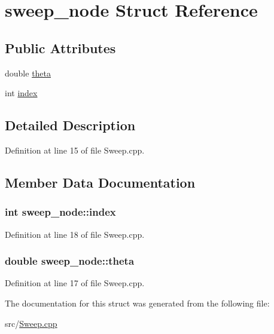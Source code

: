 \hypertarget{structsweep__node}{
\section{sweep\_\-node Struct Reference}
\label{structsweep__node}
}
\subsection*{Public Attributes}
\begin{DoxyCompactItemize}
\item 
double \hyperlink{structsweep__node_a6a5c4969b98240f34124e39ceaa2810d}{theta}
\item 
int \hyperlink{structsweep__node_ac5c548a612462479e078df26fa17b625}{index}
\end{DoxyCompactItemize}


\subsection{Detailed Description}


Definition at line 15 of file Sweep.cpp.



\subsection{Member Data Documentation}
\hypertarget{structsweep__node_ac5c548a612462479e078df26fa17b625}{
\subsubsection[{index}]{\setlength{\rightskip}{0pt plus 5cm}int {\bf sweep\_\-node::index}}}
\label{structsweep__node_ac5c548a612462479e078df26fa17b625}


Definition at line 18 of file Sweep.cpp.

\hypertarget{structsweep__node_a6a5c4969b98240f34124e39ceaa2810d}{
\subsubsection[{theta}]{\setlength{\rightskip}{0pt plus 5cm}double {\bf sweep\_\-node::theta}}}
\label{structsweep__node_a6a5c4969b98240f34124e39ceaa2810d}


Definition at line 17 of file Sweep.cpp.



The documentation for this struct was generated from the following file:\begin{DoxyCompactItemize}
\item 
src/\hyperlink{_sweep_8cpp}{Sweep.cpp}\end{DoxyCompactItemize}
